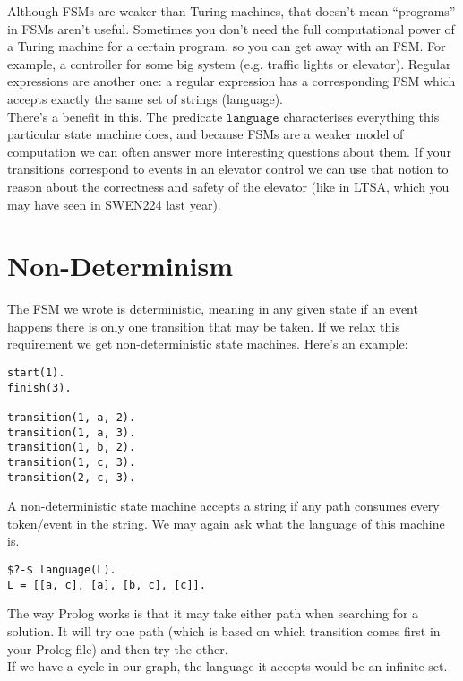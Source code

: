\documentclass[a4paper,12pt]{article}
\newcommand{\kwa}[1]{\mathtt{#1}}
\begin{document}
\noindent
Although FSMs are weaker than Turing machines, that doesn't mean ``programs'' in FSMs aren't useful. Sometimes you don't need the full computational power of a Turing machine for a certain program, so you can get away with an FSM. For example, a controller for some big system (e.g. traffic lights or elevator). Regular expressions are another one: a regular expression has a corresponding FSM which accepts exactly the same set of strings (language). \\

\noindent
There's a benefit in this. The predicate $\kwa{language}$ characterises everything this particular state machine does, and because FSMs are a weaker model of computation we can often answer more interesting questions about them. If your transitions correspond to events in an elevator control we can use that notion to reason about the correctness and safety of the elevator (like in LTSA, which you may have seen in SWEN224 last year).

\section{Non-Determinism}

The FSM we wrote is deterministic, meaning in any given state if an event happens there is only one transition that may be taken. If we relax this requirement we get non-deterministic state machines. Here's an example:

\begin{lstlisting}
start(1).
finish(3).

transition(1, a, 2).
transition(1, a, 3).
transition(1, b, 2).
transition(1, c, 3).
transition(2, c, 3).
\end{lstlisting}

\noindent
A non-deterministic state machine accepts a string if any path consumes every token/event in the string. We may again ask what the language of this machine is.

\begin{lstlisting}
$?-$ language(L).
L = [[a, c], [a], [b, c], [c]].
\end{lstlisting}

\noindent
The way Prolog works is that it may take either path when searching for a solution. It will try one path (which is based on which transition comes first in your Prolog file) and then try the other. \\

\noindent
If we have a cycle in our graph, the language it accepts would be an infinite set.
\end{document}
